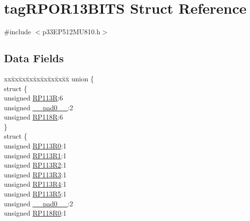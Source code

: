 \hypertarget{structtag_r_p_o_r13_b_i_t_s}{}\section{tag\+R\+P\+O\+R13\+B\+I\+TS Struct Reference}
\label{structtag_r_p_o_r13_b_i_t_s}


{\ttfamily \#include $<$p33\+E\+P512\+M\+U810.\+h$>$}

\subsection*{Data Fields}
\begin{DoxyCompactItemize}
\item 
\begin{tabbing}
xx\=xx\=xx\=xx\=xx\=xx\=xx\=xx\=xx\=\kill
union \{\\
\>struct \{\\
\>\>unsigned \hyperlink{structtag_r_p_o_r13_b_i_t_s_aa79b0fd44ed909044a5dc0710f997bea}{RP113R}:6\\
\>\>unsigned \hyperlink{structtag_r_p_o_r13_b_i_t_s_adf71f3d8410c1f1dbbc96680a92c49af}{\_\_pad0\_\_}:2\\
\>\>unsigned \hyperlink{structtag_r_p_o_r13_b_i_t_s_a232f3095d649b240d941870560adcd53}{RP118R}:6\\
\>\} \\
\>struct \{\\
\>\>unsigned \hyperlink{structtag_r_p_o_r13_b_i_t_s_a99e05810d662cb54a6f3d54017a5b3c6}{RP113R0}:1\\
\>\>unsigned \hyperlink{structtag_r_p_o_r13_b_i_t_s_a909022c6110c21640db713571907f41c}{RP113R1}:1\\
\>\>unsigned \hyperlink{structtag_r_p_o_r13_b_i_t_s_ad1a492d7c075dc7d5faceed08dc3d2c0}{RP113R2}:1\\
\>\>unsigned \hyperlink{structtag_r_p_o_r13_b_i_t_s_af8a002d2792a649a825bf8aa5437b867}{RP113R3}:1\\
\>\>unsigned \hyperlink{structtag_r_p_o_r13_b_i_t_s_a2d483115db90b04c4ad7f4e0789e2efa}{RP113R4}:1\\
\>\>unsigned \hyperlink{structtag_r_p_o_r13_b_i_t_s_a58f04139d96bc94ccef2370e4d320e5b}{RP113R5}:1\\
\>\>unsigned \hyperlink{structtag_r_p_o_r13_b_i_t_s_adf71f3d8410c1f1dbbc96680a92c49af}{\_\_pad0\_\_}:2\\
\>\>unsigned \hyperlink{structtag_r_p_o_r13_b_i_t_s_aaa2cbafdb767ff96015309e28db6277e}{RP118R0}:1\\

\end{tabbing}
\end{DoxyCompactItemize}
